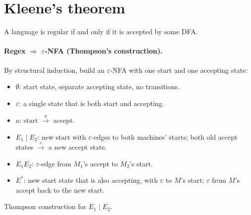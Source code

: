 \section{Kleene's theorem}

\begin{theorem}[Kleene]
A language is regular if and only if it is accepted by some DFA.
\end{theorem}

\paragraph{Regex $\Rightarrow$ $\varepsilon$-NFA (Thompson's construction).} By structural
induction, build an $\varepsilon$-NFA with one start and one accepting state:
\begin{itemize}
  \item $\emptyset$: start state, separate accepting state, no transitions.
  \item $\varepsilon$: a single state that is both start and accepting.
  \item $a$: start $\xrightarrow{a}$ accept.
  \item $E_1\mid E_2$: new start with $\varepsilon$-edges to both machines' starts; both old
        accept states $\xrightarrow{\varepsilon}$ a new accept state.
  \item $E_1E_2$: $\varepsilon$-edge from $M_1$'s accept to $M_2$'s start.
  \item $E^*$: new start state that is also accepting, with $\varepsilon$ to $M$'s start;
        $\varepsilon$ from $M$'s accept back to the new start.
\end{itemize}

\begin{center}

\small Thompson construction for $E_1 \mid E_2$.
\end{center}

